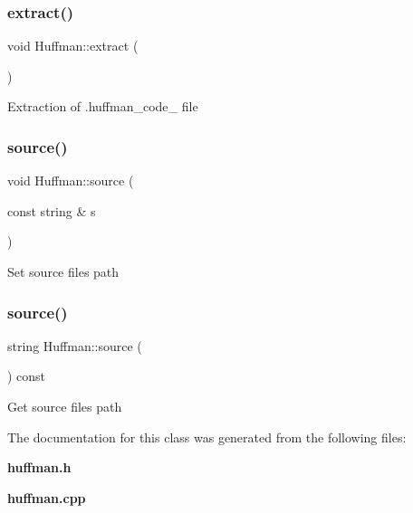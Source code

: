 \subsubsection{extract()}
{\footnotesize\ttfamily void Huffman\+::extract (\begin{DoxyParamCaption}{ }\end{DoxyParamCaption})}

Extraction of .huffman_code_ file \mbox{\label{class_huffman_a8ffa876d6b52ef4a06198dc4800bf2f3}}
\subsubsection{source()\hspace{0.1cm}{\footnotesize\ttfamily [1/2]}}
{\footnotesize\ttfamily void Huffman\+::source (\begin{DoxyParamCaption}\item[{const string \&}]{s }\end{DoxyParamCaption})\hspace{0.3cm}{\ttfamily [inline]}}

Set source file\textquotesingle{}s path \mbox{\label{class_huffman_a155055b704bd1c800a23a3a19820e357}} 
\subsubsection{source()\hspace{0.1cm}{\footnotesize\ttfamily [2/2]}}
{\footnotesize\ttfamily string Huffman\+::source (\begin{DoxyParamCaption}{ }\end{DoxyParamCaption}) const\hspace{0.3cm}{\ttfamily [inline]}}

Get source file\textquotesingle{}s path 

The documentation for this class was generated from the following files\+:\begin{DoxyCompactItemize}
\item 
\textbf{ huffman.\+h}\item 
\textbf{ huffman.\+cpp}\end{DoxyCompactItemize}
